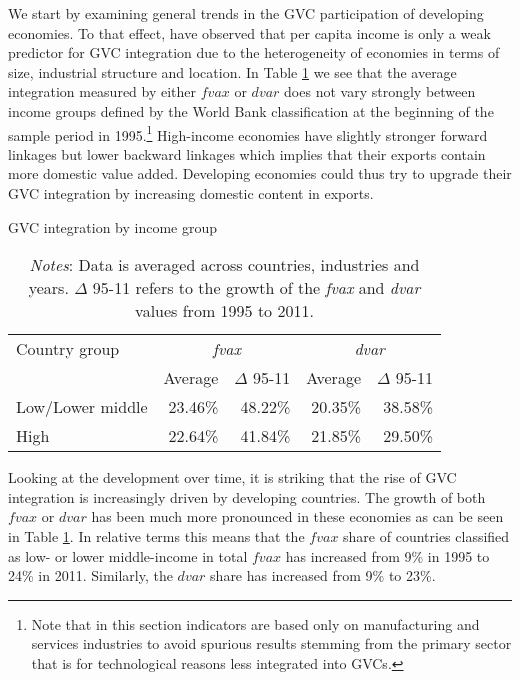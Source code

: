 \documentclass[a4paper,11pt]{article}
\begin{document}
We start by examining general trends in the GVC participation of developing economies. To that effect, \citet{rojoguno12b} have observed that per capita income is only a weak predictor for GVC integration due to the heterogeneity of economies in terms of size, industrial structure and location. In Table \ref{tab:gvc} we see that the average integration measured by either $fvax$ or $dvar$ does not vary strongly between income groups defined by the World Bank classification at the beginning of the sample period in 1995.\footnote{Note that in this section indicators are based only on manufacturing and services industries to avoid spurious results stemming from the primary sector that is for technological reasons less integrated into GVCs.}
High-income economies have slightly stronger forward linkages but lower backward linkages which implies that their exports contain more domestic value added. Developing economies could thus try to upgrade their GVC integration by increasing domestic content in exports.\\

\begin{table}[htbp]\small
  \centering
  \caption{GVC integration by income group}
    \begin{tabular}{lrrrr}
    \toprule
    Country group & \multicolumn{2}{c}{\textit{fvax}} & \multicolumn{2}{c}{\textit{dvar}} \\
          & \multicolumn{1}{c}{Average} & \multicolumn{1}{c}{$\Delta$ 95-11} & \multicolumn{1}{c}{Average} & \multicolumn{1}{c}{$\Delta$ 95-11} \\
              \midrule
    Low/Lower middle & 23.46\% & 48.22\% & 20.35\% & 38.58\% \\
    High & 22.64\% & 41.84\% & 21.85\% & 29.50\% \\
    \bottomrule
    \end{tabular}
  \label{tab:gvc}
    \caption*{\textit{Notes}: Data is averaged across countries, industries and years. $\Delta$ 95-11 refers to the growth of the \textit{fvax} and \textit{dvar} values from 1995 to 2011.}
\end{table}

Looking at the development over time, it is striking that the rise of GVC integration is increasingly driven by developing countries. The growth of both $fvax$ or $dvar$ has been much more pronounced in these economies as can be seen in Table \ref{tab:gvc}. In relative terms this means that the $fvax$ share of countries classified as low- or lower middle-income in total $fvax$ has increased from 9\% in 1995 to 24\% in 2011. Similarly, the $dvar$ share has increased from 9\% to 23\%.
\end{document}
